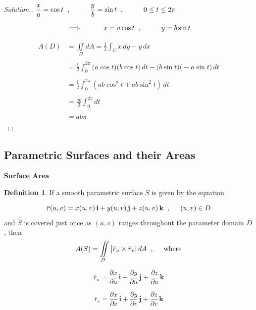 \documentclass[11pt,a4paper]{article}
\theoremstyle{definition}
\newtheorem{defn}[thm]{Definition}
\newenvironment{solution}
  {\renewcommand{\qedsymbol}{}\begin{proof}[\textit{Solution}.]}
  {\end{proof}}
\begin{document}
\begin{solution}


$\displaystyle{\frac{x}{a} = \cos t\hspace{0.2cm}, \hspace{1cm} \frac{y}{b}  = \sin t\hspace{0.2cm} , \hspace{1cm} 0\leq t \leq 2\pi}$


$$\implies \hspace{1cm} x = a \cos t\hspace{0.2cm} , \hspace{1cm} y = b\sin t$$

\begin{align*}
A(D) & = \iint\limits_D dA = \frac{1}{2} \int_C x\,dy - y\,dx\\\\
& = \frac{1}{2}\int^{2\pi}_0 \big(a\cos t\big) \big(b\cos t\big) \,dt - \big(b\sin t \big) \big(-a\sin t\big)\, dt\\\\
& = \frac{1}{2}\int^{2\pi}_0(ab\cos^2t + ab \sin^2t)\, dt\\\\
& = \frac{ab}{2}\int^{2\pi}_0 dt\\\\
& = ab\pi\\
\end{align*}

\pagebreak
\end{solution}
{\color[wave]{485}\subsection{Parametric Surfaces and their Areas}}

{\color[wave]{485} \textbf{Surface Area}}


\begin{defn}


If a smooth  parametric surface $S$ is given by the equation 

$$\overline{r}(u,v) = x(u,v)\,\textbf{i} + y(u,v)\,\textbf{j} + z(u,v)\,\textbf{k}\hspace{0.2cm},\hspace{0.5cm} (u,v)\in D$$
and $S$ is covered just once as $(u,v)$ ranges throughout the parameter domain $D$, then 
$$A(S) = \iint\limits_D\begin{vmatrix}
\overline{r}_u \times \overline{r}_v\\
\end{vmatrix} dA\hspace{0.2cm}, \hspace{0.5cm} \text{where}$$

$$\overline{r}_u = \frac{\partial x}{\partial u}\,\textbf{i} + \frac{\partial y}{\partial u}\,\textbf{j} + \frac{\partial z}{\partial u}\,\textbf{k}$$

$$\overline{r}_v = \frac{\partial x}{\partial v}\,\textbf{i} + \frac{\partial y}{\partial v}\,\textbf{j} + \frac{\partial z}{\partial v}\,\textbf{k}$$
\end{defn}
\end{document}

